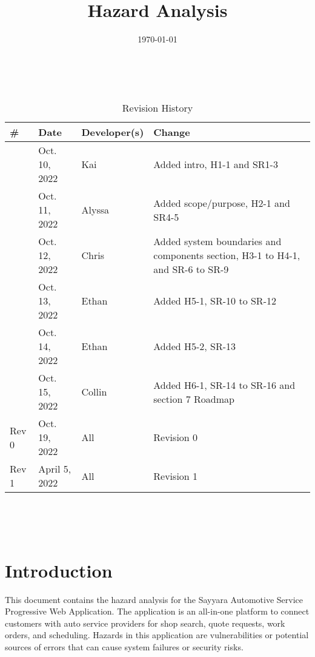 \documentclass{article}
\title{Hazard Analysis\\\progname}
\author{\authname}
\date{\today}
\begin{document}
\maketitle
\thispagestyle{empty}

~\newpage


\begin{table}[hp]
    \begin{tabularx}{\textwidth}{lllX}
        \toprule
        \textbf{\#} & \textbf{Date} & \textbf{Developer(s)} & \textbf{Change}\\
        \midrule
           & Oct. 10, 2022 & Kai & Added intro, H1-1 and SR1-3\\
        & Oct. 11, 2022 & Alyssa & Added scope/purpose, H2-1 and SR4-5\\
        & Oct. 12, 2022 & Chris & Added system boundaries and components section, H3-1 to H4-1, and SR-6 to SR-9\\
        & Oct. 13, 2022 & Ethan & Added H5-1, SR-10 to SR-12\\
        & Oct. 14, 2022 & Ethan & Added H5-2, SR-13\\ 
        & Oct. 15, 2022 & Collin & Added H6-1, SR-14 to SR-16 and section 7 Roadmap\\
        Rev 0 & Oct. 19, 2022 & All & Revision 0\\
        Rev 1 & April 5, 2022 & All & Revision 1\\
        \bottomrule
    \end{tabularx}
    \caption{Revision History} \label{TblRevisionHistory}
\end{table}

~\newpage

\tableofcontents

\listoftables

~\newpage


\section{Introduction}

This document contains the hazard analysis for the Sayyara Automotive Service Progressive Web Application. The application is an all-in-one platform to connect customers with auto service providers for shop search, quote requests, work orders, and scheduling. Hazards in this application are vulnerabilities or potential sources of errors that can cause system failures or security risks.
\end{document}
